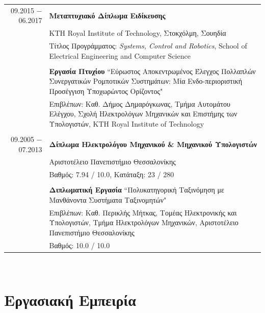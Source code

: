 \documentclass[a4paper,10pt,twoside]{article}
\begin{document}
\begin{tabular}{rp{11cm}}
09.2015 $-$ 06.2017 & \textbf{Μεταπτυχιακό Δίπλωμα Ειδίκευσης} \\
                    & KTH Royal Institute of Technology, Στοκχόλμη, Σουηδία\\
                    & Τίτλος Προγράμματος: \textit{Systems, Control and Robotics}, School of Electrical Engineering and Computer Science\\

&\\                 & \textbf{Εργασία Πτυχίου} ``Εύρωστος Αποκεντρωμένος Έλεγχος Πολλαπλών Συνεργατικών Ρομποτικών Συστημάτων: Μία Ενδο-περιοριστική
                      Προσέγγιση Υποχωρώντος Ορίζοντος" \\
                    & Επιβλέπων: Καθ. Δήμος Δημαρόγκωνας, Τμήμα Αυτομάτου Ελέγχου, Σχολή Ηλεκτρολόγων Μηχανικών και Επιστήμης των Υπολογιστών,
                      KTH Royal Institute of Technology\\
&\\
09.2005 $-$ 07.2013 & \textbf{Δίπλωμα Ηλεκτρολόγου Μηχανικού \& Μηχανικού Υπολογιστών} \\
                    & Αριστοτέλειο Πανεπιστήμιο Θεσσαλονίκης \\
                    & Βαθμός: 7.94 / 10.0, Κατάταξη: 23 / 280 \\
&\\
                    & \textbf{Διπλωματική Εργασία} ``Πολυκατηγορική Ταξινόμηση με Μανθάνοντα Συστήματα Ταξινομητών"\\
                    & Επιβλέπων: Καθ. Περικλής Μήτκας, Τομέας Ηλεκτρονικής και Υπολογιστών, Τμήμα Ηλεκτρολόγων Μηχανικών,
                      Αριστοτέλειο Πανεπιστήμιο Θεσσαλονίκης\\
                    & Βαθμός: 10.0 / 10.0
\end{tabular}\\



\section{Εργασιακή Εμπειρία}
\end{document}
